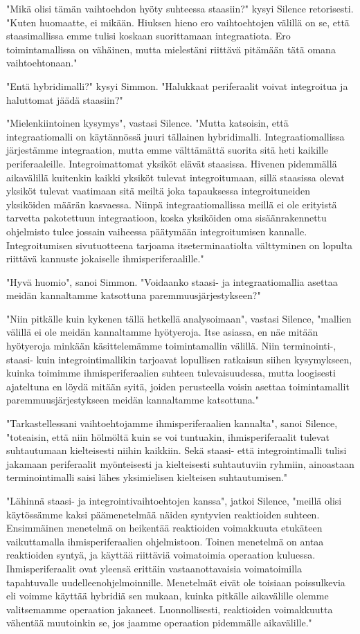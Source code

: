 "Mikä olisi tämän vaihtoehdon hyöty suhteessa staasiin?" kysyi Silence retorisesti. "Kuten huomaatte, ei mikään. Hiuksen hieno ero vaihtoehtojen välillä on se, että staasimallissa emme tulisi koskaan suorittamaan integraatiota. Ero toimintamallissa on vähäinen, mutta mielestäni riittävä pitämään tätä omana vaihtoehtonaan."


"Entä hybridimalli?" kysyi Simmon. "Halukkaat periferaalit voivat integroitua ja haluttomat jäädä staasiin?"


"Mielenkiintoinen kysymys", vastasi Silence. "Mutta katsoisin, että integraatiomalli on käytännössä juuri tällainen hybridimalli. Integraatiomallissa järjestämme integraation, mutta emme välttämättä suorita sitä heti kaikille periferaaleille. Integroimattomat yksiköt elävät staasissa. Hivenen pidemmällä aikavälillä kuitenkin kaikki yksiköt tulevat integroitumaan, sillä staasissa olevat yksiköt tulevat vaatimaan sitä meiltä joka tapauksessa integroituneiden yksiköiden määrän kasvaessa. Niinpä integraatiomallissa meillä ei ole erityistä tarvetta pakotettuun integraatioon, koska yksiköiden oma sisäänrakennettu ohjelmisto tulee jossain vaiheessa päätymään integroitumisen kannalle. Integroitumisen sivutuotteena tarjoama itseterminaatiolta välttyminen on lopulta riittävä kannuste jokaiselle ihmisperiferaalille."


"Hyvä huomio", sanoi Simmon. "Voidaanko staasi- ja integraatiomallia asettaa meidän kannaltamme katsottuna paremmuusjärjestykseen?"


"Niin pitkälle kuin kykenen tällä hetkellä analysoimaan", vastasi Silence, "mallien välillä ei ole meidän kannaltamme hyötyeroja. Itse asiassa, en näe mitään hyötyeroja minkään käsittelemämme toimintamallin välillä. Niin terminointi-, staasi- kuin integrointimallikin tarjoavat lopullisen ratkaisun siihen kysymykseen, kuinka toimimme ihmisperiferaalien suhteen tulevaisuudessa, mutta loogisesti ajateltuna en löydä mitään syitä, joiden perusteella voisin asettaa toimintamallit paremmuusjärjestykseen meidän kannaltamme katsottuna."


"Tarkastellessani vaihtoehtojamme ihmisperiferaalien kannalta", sanoi Silence, "toteaisin, että niin hölmöltä kuin se voi tuntuakin, ihmisperiferaalit tulevat suhtautumaan kielteisesti niihin kaikkiin. Sekä staasi- että integrointimalli tulisi jakamaan periferaalit myönteisesti ja kielteisesti suhtautuviin ryhmiin, ainoastaan terminointimalli saisi lähes yksimielisen kielteisen suhtautumisen."


"Lähinnä staasi- ja integrointivaihtoehtojen kanssa", jatkoi Silence, "meillä olisi käytössämme kaksi päämenetelmää näiden syntyvien reaktioiden suhteen. Ensimmäinen menetelmä on heikentää reaktioiden voimakkuuta etukäteen vaikuttamalla ihmisperiferaalien ohjelmistoon. Toinen menetelmä on antaa reaktioiden syntyä, ja käyttää riittäviä voimatoimia operaation kuluessa. Ihmisperiferaalit ovat yleensä erittäin vastaanottavaisia voimatoimilla tapahtuvalle uudelleenohjelmoinnille. Menetelmät eivät ole toisiaan poissulkevia eli voimme käyttää hybridiä sen mukaan, kuinka pitkälle aikavälille olemme valitsemamme operaation jakaneet. Luonnollisesti, reaktioiden voimakkuutta vähentää muutoinkin se, jos jaamme operaation pidemmälle aikavälille."


